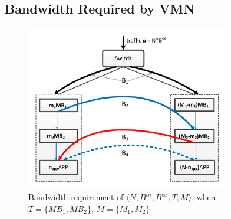 \documentclass[review]{elsarticle}
\begin{document}
\subsection{Bandwidth Required by VMN}


\begin{figure}
	\centering
	     \includegraphics[width=3.5in]{fig/bandwidth_requirement3.pdf}
	\caption{Bandwidth requirement of $\langle N,B^{in},B^{ex},T,M\rangle$, where $T=\{MB_1,MB_2\}$, $M=\{M_1,M_2\}$}
	\label{fig:bw}
\end{figure}
\end{document}
